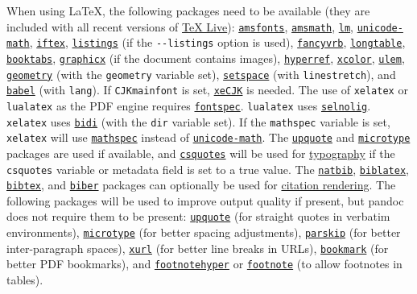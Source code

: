 \documentclass[
]{article}
\begin{document}
When using LaTeX, the following packages need to be available (they are
included with all recent versions of
\href{https://www.tug.org/texlive/}{TeX Live}):
\href{https://ctan.org/pkg/amsfonts}{\texttt{amsfonts}},
\href{https://ctan.org/pkg/amsmath}{\texttt{amsmath}},
\href{https://ctan.org/pkg/lm}{\texttt{lm}},
\href{https://ctan.org/pkg/unicode-math}{\texttt{unicode-math}},
\href{https://ctan.org/pkg/iftex}{\texttt{iftex}},
\href{https://ctan.org/pkg/listings}{\texttt{listings}} (if the
\texttt{-\/-listings} option is used),
\href{https://ctan.org/pkg/fancyvrb}{\texttt{fancyvrb}},
\href{https://ctan.org/pkg/longtable}{\texttt{longtable}},
\href{https://ctan.org/pkg/booktabs}{\texttt{booktabs}},
\href{https://ctan.org/pkg/graphicx}{\texttt{graphicx}} (if the document
contains images),
\href{https://ctan.org/pkg/hyperref}{\texttt{hyperref}},
\href{https://ctan.org/pkg/xcolor}{\texttt{xcolor}},
\href{https://ctan.org/pkg/ulem}{\texttt{ulem}},
\href{https://ctan.org/pkg/geometry}{\texttt{geometry}} (with the
\texttt{geometry} variable set),
\href{https://ctan.org/pkg/setspace}{\texttt{setspace}} (with
\texttt{linestretch}), and
\href{https://ctan.org/pkg/babel}{\texttt{babel}} (with \texttt{lang}).
If \texttt{CJKmainfont} is set,
\href{https://ctan.org/pkg/xecjk}{\texttt{xeCJK}} is needed. The use of
\texttt{xelatex} or \texttt{lualatex} as the PDF engine requires
\href{https://ctan.org/pkg/fontspec}{\texttt{fontspec}}.
\texttt{lualatex} uses
\href{https://ctan.org/pkg/selnolig}{\texttt{selnolig}}.
\texttt{xelatex} uses \href{https://ctan.org/pkg/bidi}{\texttt{bidi}}
(with the \texttt{dir} variable set). If the \texttt{mathspec} variable
is set, \texttt{xelatex} will use
\href{https://ctan.org/pkg/mathspec}{\texttt{mathspec}} instead of
\href{https://ctan.org/pkg/unicode-math}{\texttt{unicode-math}}. The
\href{https://ctan.org/pkg/upquote}{\texttt{upquote}} and
\href{https://ctan.org/pkg/microtype}{\texttt{microtype}} packages are
used if available, and
\href{https://ctan.org/pkg/csquotes}{\texttt{csquotes}} will be used for
\protect\hyperlink{typography}{typography} if the \texttt{csquotes}
variable or metadata field is set to a true value. The
\href{https://ctan.org/pkg/natbib}{\texttt{natbib}},
\href{https://ctan.org/pkg/biblatex}{\texttt{biblatex}},
\href{https://ctan.org/pkg/bibtex}{\texttt{bibtex}}, and
\href{https://ctan.org/pkg/biber}{\texttt{biber}} packages can
optionally be used for \protect\hyperlink{citation-rendering-1}{citation
rendering}. The following packages will be used to improve output
quality if present, but pandoc does not require them to be present:
\href{https://ctan.org/pkg/upquote}{\texttt{upquote}} (for straight
quotes in verbatim environments),
\href{https://ctan.org/pkg/microtype}{\texttt{microtype}} (for better
spacing adjustments),
\href{https://ctan.org/pkg/parskip}{\texttt{parskip}} (for better
inter-paragraph spaces), \href{https://ctan.org/pkg/xurl}{\texttt{xurl}}
(for better line breaks in URLs),
\href{https://ctan.org/pkg/bookmark}{\texttt{bookmark}} (for better PDF
bookmarks), and
\href{https://ctan.org/pkg/footnotehyper}{\texttt{footnotehyper}} or
\href{https://ctan.org/pkg/footnote}{\texttt{footnote}} (to allow
footnotes in tables).
\end{document}
